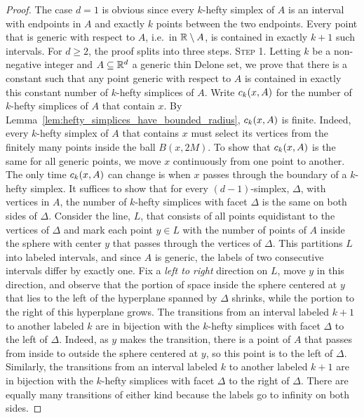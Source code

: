\documentclass[a4paper,UKenglish,cleveref, autoref,numberwithinsect]{socg-lipics-v2021}
\newcommand {\mm}[1] {\ifmmode{#1}\else{\mbox{\(#1\)}}\fi}
\theoremstyle{plain}
\newcommand{\Rspace}        {\mm{{\mathbb R}}}
\newcommand{\cover}[2]      {\mm{{c}_{#1}{({#2})}}}
\begin{document}
\begin{proof}
  The case $d=1$ is obvious since every $k$-hefty simplex of $A$ is an interval with endpoints in $A$ and exactly $k$ points between the two endpoints.
  Every point that is generic with respect to $A$, i.e.\ in $\Rspace \setminus A$, is contained in exactly $k+1$ such intervals.
  For $d \geq 2$, the proof splits into three steps.
  \medskip \noindent
  \textsc{Step 1.} Letting $k$ be a non-negative integer and $A \subseteq \Rspace^d$ a generic thin Delone set, we prove that there is a constant such that any point generic with respect to $A$ is contained in exactly this constant number of $k$-hefty simplices of $A$.
  Write $\cover{k}{x,A}$ for the number of $k$-hefty simplices of $A$ that contain $x$. 
  By Lemma~\ref{lem:hefty_simplices_have_bounded_radius}, $\cover{k}{x,A}$ is finite.
  Indeed, every $k$-hefty simplex of $A$ that contains $x$ must select its vertices from the finitely many points inside the ball $B(x,2M)$.
  To show that $\cover{k}{x,A}$ is the same for all generic points, we move $x$ continuously from one point to another.
  The only time $\cover{k}{x,A}$ can change is when $x$ passes through the boundary of a $k$-hefty simplex. 
  It suffices to show that for every $(d-1)$-simplex, $\Delta$, with vertices in $A$, the number of $k$-hefty simplices with facet $\Delta$ is the same on both sides of $\Delta$. 
  \smallskip
  Consider the line, $L$, that consists of all points equidistant to the vertices of $\Delta$ and mark each point $y \in L$ with the number of points of $A$ inside the sphere with center $y$ that passes through the vertices of $\Delta$.
  This partitions $L$ into labeled intervals, and since $A$ is generic, the labels of two consecutive intervals differ by exactly one.
  Fix a \emph{left to right} direction on $L$, move $y$ in this direction, and observe that the portion of space inside the sphere centered at $y$ that lies to the left of the hyperplane spanned by $\Delta$ shrinks, while the portion to the right of this hyperplane grows.
  The transitions from an interval labeled $k+1$ to another labeled $k$ are in bijection with the $k$-hefty simplices with facet $\Delta$ to the left of $\Delta$.
  Indeed, as $y$ makes the transition, there is a point of $A$ that passes from inside to outside the sphere centered at $y$, so this point is to the left of $\Delta$.
  Similarly, the transitions from an interval labeled $k$ to another labeled $k+1$ are in bijection with the $k$-hefty simplices with facet $\Delta$ to the right of $\Delta$.
  There are equally many transitions of either kind because the labels go to infinity on both sides.

\end{proof}
\end{document}
